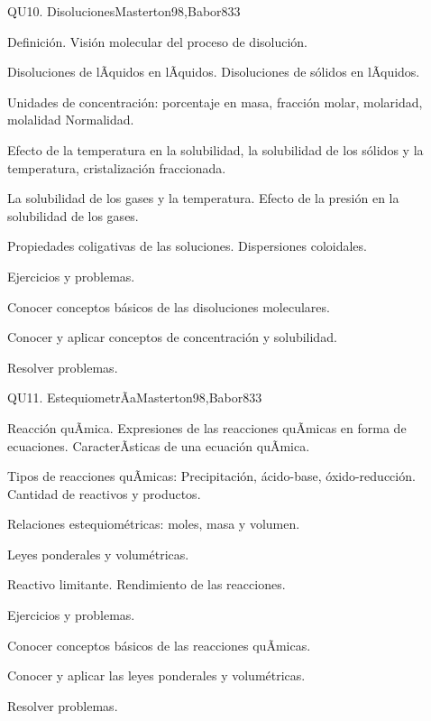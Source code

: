 \begin{syllabus}
\begin{unit}{QU10. Disoluciones}{Masterton98,Babor83}{3}
\begin{topics}
      \item Definición. Visión molecular del proceso de disolución.
      \item Disoluciones de lÃ­quidos en lÃ­quidos. Disoluciones de sólidos en lÃ­quidos.
      \item Unidades de concentración: porcentaje en masa, fracción molar, molaridad, molalidad Normalidad.
      \item Efecto de la temperatura en la solubilidad, la solubilidad de los sólidos y la temperatura, cristalización fraccionada.
      \item La solubilidad de los gases y la temperatura. Efecto  de la presión en la solubilidad de los gases.
      \item Propiedades coligativas de las soluciones. Dispersiones coloidales.
      \item Ejercicios y problemas.
    \end{topics}

   \begin{unitgoals}
      \item Conocer conceptos básicos de las disoluciones moleculares.
      \item Conocer y aplicar conceptos de concentración y solubilidad.
      \item Resolver problemas.
   \end{unitgoals}
\end{unit}

\begin{unit}{QU11. EstequiometrÃ­a}{Masterton98,Babor83}{3}
\begin{topics}
      \item Reacción quÃ­mica. Expresiones de las reacciones quÃ­micas en forma de ecuaciones. CaracterÃ­sticas de una ecuación quÃ­mica.
      \item Tipos de reacciones quÃ­micas: Precipitación, ácido-base, óxido-reducción. Cantidad de reactivos y productos.
      \item Relaciones estequiométricas: moles, masa y volumen.
      \item Leyes ponderales y volumétricas.
      \item Reactivo limitante. Rendimiento de las reacciones.
      \item Ejercicios y problemas.
    \end{topics}

   \begin{unitgoals}
      \item Conocer conceptos básicos de las reacciones quÃ­micas.
      \item Conocer y aplicar las leyes ponderales y volumétricas.
      \item Resolver problemas.
   \end{unitgoals}
\end{unit}

\begin{coursebibliography}
\end{coursebibliography}
\end{syllabus}
